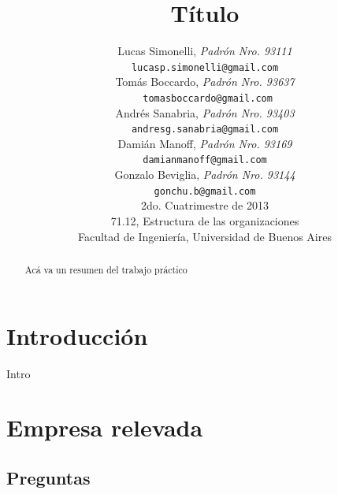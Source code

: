 \documentclass[a4paper,10pt]{article}
\title{		\textbf{Título}}
\author{	Lucas Simonelli, \textit{Padrón Nro. 93111}                     \\
            \texttt{ lucasp.simonelli@gmail.com }                                              \\[2.5ex]
            Tomás Boccardo, \textit{Padrón Nro. 93637}                     \\
            \texttt{ tomasboccardo@gmail.com}                                              \\[2.5ex]
            Andrés Sanabria, \textit{Padrón Nro. 93403}                     \\
            \texttt{ andresg.sanabria@gmail.com  }                                              \\[2.5ex]
            Dami\'an Manoff, \textit{Padrón Nro. 93169}                     \\
            \texttt{ damianmanoff@gmail.com  }                                              \\[2.5ex]
            Gonzalo Beviglia, \textit{Padrón Nro. 93144}                     \\
            \texttt{ gonchu.b@gmail.com  }                                              \\[2.5ex]
            \normalsize{2do. Cuatrimestre de 2013}                                      \\
            \normalsize{71.12, Estructura de las organizaciones}  \\
            \normalsize{Facultad de Ingeniería, Universidad de Buenos Aires}            \\
       }
\date{}
\begin{document}
\maketitle
\thispagestyle{empty}   %



\begin{abstract}
Acá va un resumen del trabajo práctico
\end{abstract}

\newpage
\tableofcontents
\newpage
\section{Introducción}
Intro
\section{Empresa relevada}
	\subsection{Preguntas}
\end{document}
